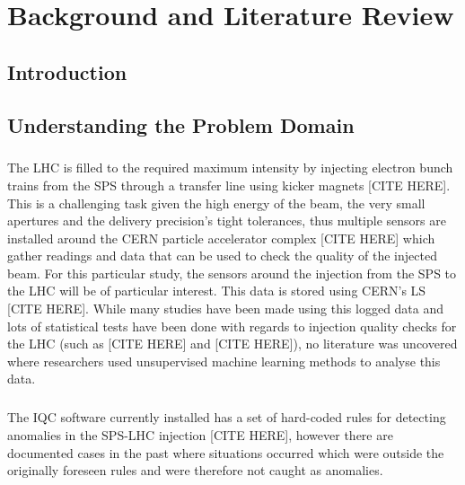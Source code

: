 \chapter{Background and Literature Review}
\section{Introduction}

\section{Understanding the Problem Domain}


\paragraph{ }The \acs{LHC} is filled to the required maximum intensity by injecting electron bunch trains from the \acs{SPS} through a transfer line using kicker magnets [CITE HERE]. This is a challenging task given the high energy of the beam, the very small apertures and the delivery precision's tight tolerances, thus multiple sensors are installed around the \acs{CERN} particle accelerator complex [CITE HERE] which gather readings and data that can be used to check the quality of the injected beam. For this particular study, the sensors around the injection from the \acs{SPS} to the \acs{LHC} will be of particular interest. This data is stored using \acs{CERN}'s \ac{LS} [CITE HERE]. While many studies have been made using this logged data and lots of statistical tests have been done with regards to injection quality checks for the \acs{LHC} (such as [CITE HERE] and [CITE HERE]), no literature was uncovered where researchers used unsupervised machine learning methods to analyse this data.

\paragraph{ }The \ac{IQC} software currently installed has a set of hard-coded rules for detecting anomalies in the \acs{SPS}-\acs{LHC} injection [CITE HERE], however there are documented cases in the past where situations occurred which were outside the originally foreseen rules and were therefore not caught as anomalies.


